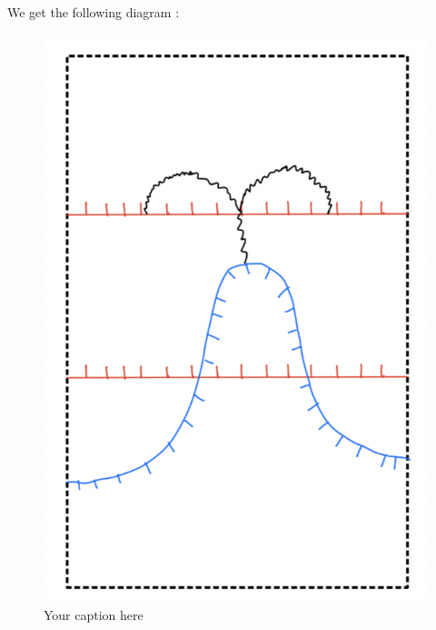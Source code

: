 We get the following diagram :

\begin{figure}[H] %
    \centering
    \includegraphics[width=\linewidth]{diagrams/lemma8/4.png} %
    \caption{Your caption here}
    \label{fig:your-label}
\end{figure}

